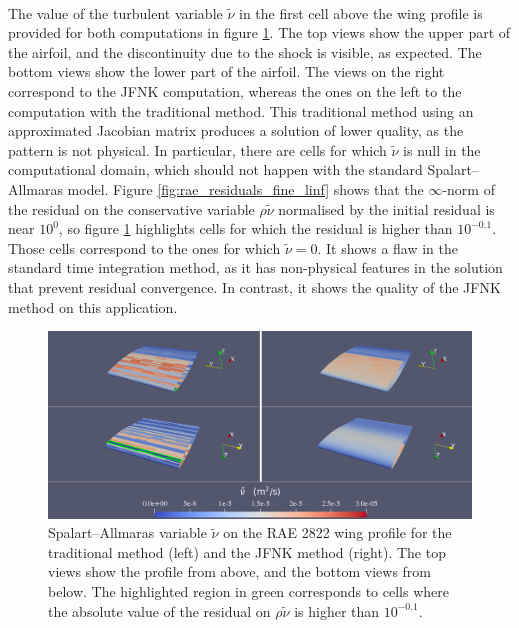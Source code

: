         \paragraph{}
        The value of the turbulent variable $\tilde{\nu}$ in the first cell above the wing profile is provided for both computations in figure \ref{fig:rae_field_fine}.
        The top views show the upper part of the airfoil, and the discontinuity due to the shock is visible, as expected.
        The bottom views show the lower part of the airfoil.
        The views on the right correspond to the JFNK computation, whereas the ones on the left to the computation with the traditional method.
        This traditional method using an approximated Jacobian matrix produces a solution of lower quality, as the pattern is not physical.
        In particular, there are cells for which $\tilde{\nu}$ is null in the computational domain, which should not happen with the standard Spalart--Allmaras model.
        Figure \ref{fig:rae_residuals_fine_linf} shows that the $\infty$-norm of the residual on the conservative variable $\rho \tilde{\nu}$ normalised by the initial residual is near $10^0$, so figure \ref{fig:rae_field_fine} highlights cells for which the residual is higher than $10^{-0.1}$.
        Those cells correspond to the ones for which $\tilde{\nu} = 0$.
        It shows a flaw in the standard time integration method, as it has non-physical features in the solution that prevent residual convergence.
        In contrast, it shows the quality of the JFNK method on this application.

        \begin{figure}
          \centering
          \includegraphics[width=\textwidth]{figures/rae_field_fine.png}
          \caption{
            Spalart--Allmaras variable $\tilde{\nu}$ on the RAE 2822 wing profile for the traditional method (left) and the JFNK method (right).
            The top views show the profile from above, and the bottom views from below.
            The highlighted region in green corresponds to cells where the absolute value of the residual on $\rho \tilde{\nu}$ is higher than $10^{-0.1}$.
          }
          \label{fig:rae_field_fine}
        \end{figure}


